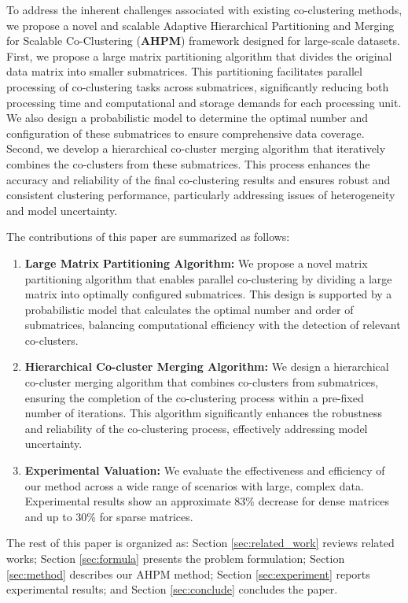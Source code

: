 \documentclass[letterpaper, 10 pt, conference]{ieeeconf}  %
\begin{document}
To address the inherent challenges associated with existing co-clustering methods, we propose a novel and scalable Adaptive Hierarchical Partitioning and Merging for Scalable Co-Clustering (\textbf{AHPM}) framework designed for large-scale datasets. First,  we propose a large matrix partitioning algorithm that divides the original data matrix into smaller submatrices. This partitioning facilitates parallel processing of co-clustering tasks across submatrices, significantly reducing both processing time and computational and storage demands for each processing unit. We also design a probabilistic model to determine the optimal number and configuration of these submatrices to ensure comprehensive data coverage.
Second, we develop a hierarchical co-cluster merging algorithm that iteratively combines the co-clusters from these submatrices. This process enhances the accuracy and reliability of the final co-clustering results and ensures robust and consistent clustering performance, particularly addressing issues of heterogeneity and model uncertainty.

The contributions of this paper are summarized as follows:
\begin{enumerate}
    \item \textbf{Large Matrix Partitioning Algorithm:}
          We propose a novel matrix partitioning algorithm that enables parallel co-clustering by dividing a large matrix into optimally configured submatrices. This design is supported by a probabilistic model that calculates the optimal number and order of submatrices, balancing computational efficiency with the detection of relevant co-clusters.
    \item \textbf{Hierarchical Co-cluster Merging Algorithm:}
          We design a hierarchical co-cluster merging algorithm that combines co-clusters from submatrices, ensuring the completion of the co-clustering process within a pre-fixed number of iterations. This algorithm significantly enhances the robustness and reliability of the co-clustering process, effectively addressing model uncertainty.
    \item \textbf{Experimental Valuation:}
          We evaluate the effectiveness and efficiency of our method across a wide range of scenarios with large, complex data. Experimental results show an approximate 83\% decrease for dense matrices and up to 30\% for sparse matrices.
\end{enumerate}

The rest of this paper is organized as: Section \ref{sec:related_work} reviews related works; Section \ref{sec:formula} presents the problem formulation; Section \ref{sec:method} describes our AHPM method; Section \ref{sec:experiment} reports experimental results; and Section \ref{sec:conclude} concludes the paper.
\end{document}
